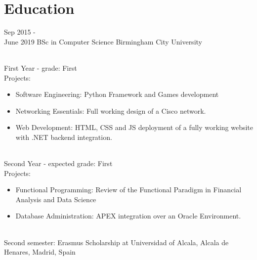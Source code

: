 \documentclass[]{friggeri-cv}
\begin{document}
\section{Education}
\begin{entrylist}
  \entry
  {Sep 2015 - \\ June 2019}
  {BSc in Computer Science}
  {Birmingham City University}
  {
    \\First Year - grade: First
    \\Projects: 
	\begin{itemize}
      \item Software Engineering: Python Framework and Games development
      \item Networking Essentials: Full working design of a Cisco network.
      \item Web Development: HTML, CSS and JS deployment of a fully working website with .NET backend integration.
    \end{itemize}
    \hfill\break
    \\Second Year - expected grade: First 
    \\Projects: 
        \begin{itemize}
            \item Functional Programming: Review of the Functional Paradigm in Financial Analysis and Data Science
            \item Database Administration: APEX integration over an Oracle Environment.
        \end{itemize}
    \\Second semester: Erasmus Scholarship at Universidad of Alcala, Alcala de Henares, Madrid, Spain 
    }
  \end{entrylist}

\newpage
\end{document}
